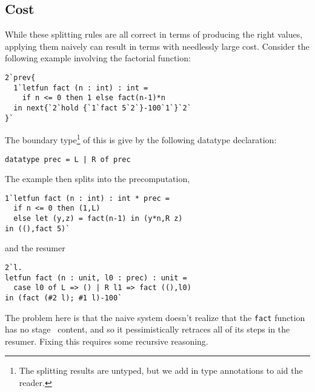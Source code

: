 
\subsection{Cost}

While these splitting rules are all correct in terms of producing the right values, applying them naively can result in terms with needlessly large cost.  Consider the following example involving the factorial function:
\begin{lstlisting}
2`prev{
  1`letfun fact (n : int) : int = 
    if n <= 0 then 1 else fact(n-1)*n
  in next{`2`hold {`1`fact 5`2`}-100`1`}`2`
}`
\end{lstlisting}

The boundary type\footnote{The splitting results are untyped, but we add in type annotations to aid the reader.} of this is give by the following datatype declaration:
\begin{lstlisting}
datatype prec = L | R of prec
\end{lstlisting}
The example then splits into the precomputation,
\begin{lstlisting}
1`letfun fact (n : int) : int * prec = 
  if n <= 0 then (1,L) 
  else let (y,z) = fact(n-1) in (y*n,R z)
in ((),fact 5)`
\end{lstlisting}
and the resumer
\begin{lstlisting}
2`l.
letfun fact (n : unit, l0 : prec) : unit = 
  case l0 of L => () | R l1 => fact ((),l0)
in (fact (#2 l); #1 l)-100`
\end{lstlisting}
The problem here is that the naive system doesn't realize that the \texttt{fact} function has no stage \bbtwo\ content,
and so it pessimistically retraces all of its steps in the resumer.  
Fixing this requires some recursive reasoning.  

